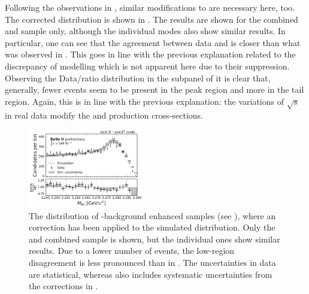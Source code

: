 Following the observations in , similar modifications to \Mbc are necessary here, too.
The corrected \Mbc distribution is shown in .
The results are shown for the combined \feiBp and \feiBz sample only, although the individual \FEI modes also show similar results.
In particular, one can see that the agreement between data and \MC is closer than what was observed in .
This goes in line with the previous explanation related to the discrepancy of \epem\ra\qqbar modelling which is not apparent here due to their suppression.
Observing the Data/\MC ratio distribution in the subpanel of  it is clear that, generally, fewer events seem to be present in the peak region and more in the tail region.
Again, this is in line with the previous explanation: the variations of $\sqrt{s}$ in real data modify the \FourS and \epem\ra\qqbar production cross-sections.
\begin{figure}[htbp!]
    \centering
    \includegraphics[width=0.45\textwidth]{figures/data_validation/Bboth_bbbar_enhanced_mbccorrected.pdf}
    \caption{\label{fig:bbbar_enhanced_mbccorrected} The \Mbc distribution of \BB-background enhanced samples (see ),
    where an \Mbc correction has been applied to the simulated distribution.
    Only the \feiBp and \feiBz combined sample is shown, but the individual ones show similar results.
    Due to a lower number of \epem\ra\qqbar events, the low-\Mbc region disagreement is less pronounced than in .
    The uncertainties in data are statistical, whereas \MC also includes systematic uncertainties from the corrections in .
    }
\end{figure}

